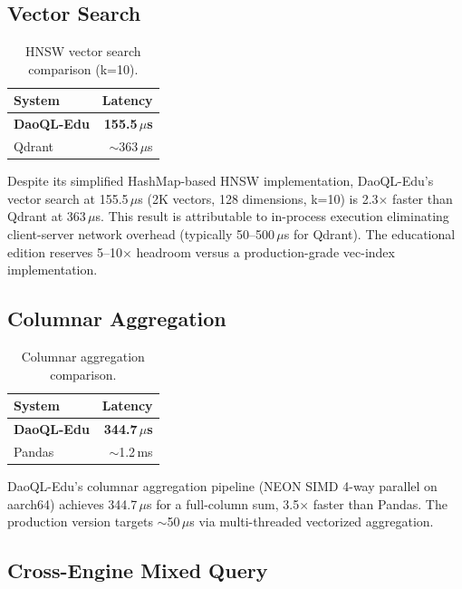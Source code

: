 \documentclass[11pt,a4paper]{article}
\begin{document}
\subsection{Vector Search}

\begin{table}[ht]
\centering
\caption{HNSW vector search comparison (k=10).}
\begin{tabular}{lr}
\toprule
\textbf{System} & \textbf{Latency} \\
\midrule
\textbf{DaoQL-Edu}  & \textbf{155.5\,$\mu$s} \\
Qdrant              & $\sim$363\,$\mu$s \\
\bottomrule
\end{tabular}
\label{tab:vector}
\end{table}

Despite its simplified HashMap-based HNSW implementation, DaoQL-Edu's
vector search at 155.5\,$\mu$s (2K vectors, 128 dimensions, k=10) is
2.3$\times$ faster than Qdrant at 363\,$\mu$s. This result is attributable
to in-process execution eliminating client-server network overhead
(typically 50--500\,$\mu$s for Qdrant). The educational edition reserves
5--10$\times$ headroom versus a production-grade vec-index implementation.

\subsection{Columnar Aggregation}

\begin{table}[ht]
\centering
\caption{Columnar aggregation comparison.}
\begin{tabular}{lr}
\toprule
\textbf{System} & \textbf{Latency} \\
\midrule
\textbf{DaoQL-Edu}  & \textbf{344.7\,$\mu$s} \\
Pandas              & $\sim$1.2\,ms \\
\bottomrule
\end{tabular}
\label{tab:column}
\end{table}

DaoQL-Edu's columnar aggregation pipeline (NEON SIMD 4-way parallel on
aarch64) achieves 344.7\,$\mu$s for a full-column sum, 3.5$\times$ faster
than Pandas. The production version targets $\sim$50\,$\mu$s via
multi-threaded vectorized aggregation.

\subsection{Cross-Engine Mixed Query}
\end{document}
